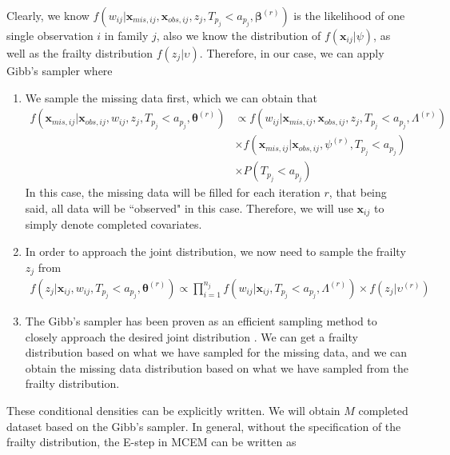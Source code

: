 \documentclass[preprint,12pt]{elsarticle}
\begin{document}
Clearly, we know $f(w_{ij}|\mathbf{x}_{mis,ij}, \mathbf{x}_{obs,ij}, z_j, T_{p_j}<a_{p_j}, \boldsymbol{\beta}^{(r)})$ is the likelihood of one single observation $i$ in family $j$, also we know the distribution of $f(\mathbf{x}_{ij}|\psi)$, as well as the frailty distribution $f(z_j|\upsilon)$. 
Therefore, in our case, we can apply Gibb's sampler where 

\begin{enumerate} 
    \item We sample the missing data first, which we can obtain that 
    \begin{align} 
        f(\mathbf{x}_{mis,ij}|\mathbf{x}_{obs,ij}, w_{ij}, z_j, T_{p_j}<a_{p_j}, \boldsymbol{\theta}^{(r)})&\propto f(w_{ij}|\mathbf{x}_{mis,ij}, \mathbf{x}_{obs,ij}, z_j, T_{p_j}<a_{p_j}, \Lambda^{(r)})\\
        &\times f(\mathbf{x}_{mis,ij}|\mathbf{x}_{obs,ij},\psi^{(r)}, T_{p_j}<a_{p_j})\\
        &\times P(T_{p_j}<a_{p_j})
    \end{align}
    In this case, the missing data will be filled for each iteration $r$, that being said, all data will be ``observed" in this case. 
    Therefore, we will use $\mathbf{x}_{ij}$ to simply denote completed covariates. 
    \item In order to approach the joint distribution, we now need to sample the frailty $z_j$ from 
    \begin{align} 
        f(z_j|\mathbf{x}_{ij}, w_{ij}, T_{p_j}<a_{p_j}, \boldsymbol{\theta}^{(r)})\propto \prod_{i=1}^{n_j}f(w_{ij}|\mathbf{x}_{ij}, T_{p_j}<a_{p_j}, \Lambda^{(r)})\times f(z_j|\upsilon^{(r)})
    \end{align}
    \item The Gibb's sampler has been proven as an efficient sampling method to closely approach the desired joint distribution \cite{gelfand1990sampling}. 
    We can get a frailty distribution based on what we have sampled for the missing data, and we can obtain the missing data distribution based on what we have sampled from the frailty distribution. 
\end{enumerate}
These conditional densities can be explicitly written.
We will obtain $M$ completed dataset based on the Gibb's sampler. 
In general, without the specification of the frailty distribution, the E-step in MCEM can be written as 
\end{document}
